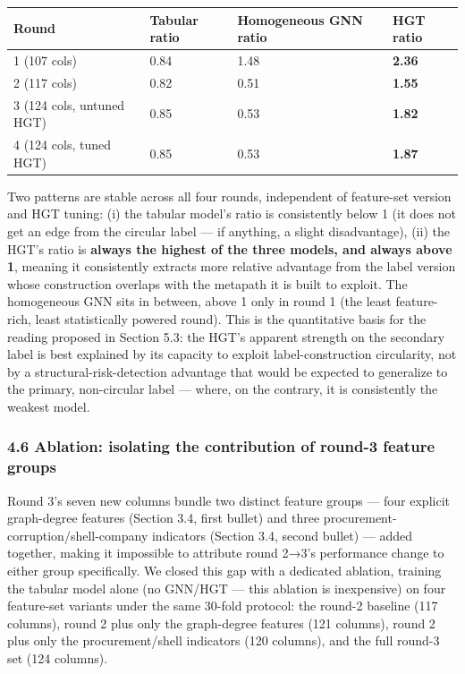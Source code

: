 \documentclass[11pt,]{article}
\begin{document}
\begin{longtable}[]{@{}llll@{}}
\toprule
Round & Tabular ratio & Homogeneous GNN ratio & HGT ratio\tabularnewline
\midrule
\endhead
1 (107 cols) & 0.84 & 1.48 & \textbf{2.36}\tabularnewline
2 (117 cols) & 0.82 & 0.51 & \textbf{1.55}\tabularnewline
3 (124 cols, untuned HGT) & 0.85 & 0.53 & \textbf{1.82}\tabularnewline
4 (124 cols, tuned HGT) & 0.85 & 0.53 & \textbf{1.87}\tabularnewline
\bottomrule
\end{longtable}

Two patterns are stable across all four rounds, independent of
feature-set version and HGT tuning: (i) the tabular model's ratio is
consistently below 1 (it does not get an edge from the circular label
--- if anything, a slight disadvantage), (ii) the HGT's ratio is
\textbf{always the highest of the three models, and always above 1},
meaning it consistently extracts more relative advantage from the label
version whose construction overlaps with the metapath it is built to
exploit. The homogeneous GNN sits in between, above 1 only in round 1
(the least feature-rich, least statistically powered round). This is the
quantitative basis for the reading proposed in Section 5.3: the HGT's
apparent strength on the secondary label is best explained by its
capacity to exploit label-construction circularity, not by a
structural-risk-detection advantage that would be expected to generalize
to the primary, non-circular label --- where, on the contrary, it is
consistently the weakest model.

\hypertarget{ablation-isolating-the-contribution-of-round-3-feature-groups}{%
\subsubsection{4.6 Ablation: isolating the contribution of round-3
feature
groups}\label{ablation-isolating-the-contribution-of-round-3-feature-groups}}

Round 3's seven new columns bundle two distinct feature groups --- four
explicit graph-degree features (Section 3.4, first bullet) and three
procurement-corruption/shell-company indicators (Section 3.4, second
bullet) --- added together, making it impossible to attribute round
2→3's performance change to either group specifically. We closed this
gap with a dedicated ablation, training the tabular model alone (no
GNN/HGT --- this ablation is inexpensive) on four feature-set variants
under the same 30-fold protocol: the round-2 baseline (117 columns),
round 2 plus only the graph-degree features (121 columns), round 2 plus
only the procurement/shell indicators (120 columns), and the full
round-3 set (124 columns).
\end{document}
